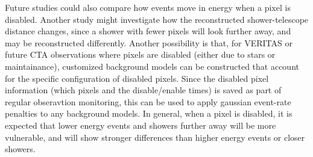     Future studies could also compare how events move in energy when a pixel is disabled.
    Another study might investigate how the reconstructed shower-telescope distance changes, since a shower with fewer pixels will look further away, and may be reconstructed differently.
    Another possibility is that, for VERITAS or future CTA observations where pixels are disabled (either due to stars or maintainance), customized background models can be constructed that account for the specific configuration of disabled pixels.
    Since the disabled pixel information (which pixels and the disable/enable times) is saved as part of regular obseravtion monitoring, this can be used to apply gaussian event-rate penalties to any background models.
    In general, when a pixel is disabled, it is expected that lower energy events and showers further away will be more vulnerable, and will show stronger differences than higher energy events or closer showers.


